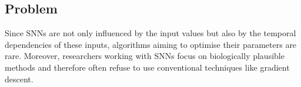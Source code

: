 \subsection{Problem}
\label{subsec:problem}

Since \acp{SNN} are not only influenced by the input values but also by the temporal dependencies of these inputs, 
algorithms aiming to optimise their parameters are rare.
Moreover, researchers working with \acp{SNN} focus on biologically plausible methods and 
therefore often refuse to use conventional techniques like gradient descent.
